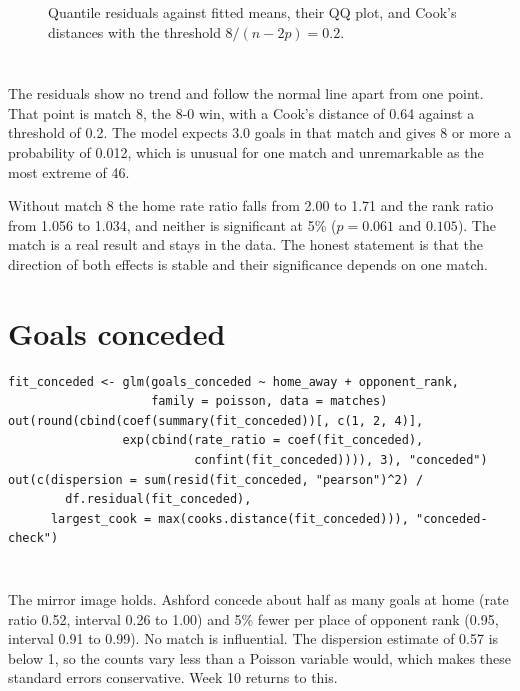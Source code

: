 \documentclass[12pt,notitlepage]{report}
\begin{document}
\begin{figure}[H]
  \centering
  \caption{Quantile residuals against fitted means, their QQ plot, and Cook's
    distances with the threshold $8/(n - 2p) = 0.2$.}
  \label{fig:checks}
\end{figure}

\inputminted{text}{output/match-8.txt}
\inputminted{text}{output/without-match-8.txt}

The residuals show no trend and follow the normal line apart from one point.
That point is match 8, the 8-0 win, with a Cook's distance of 0.64 against a
threshold of 0.2. The model expects 3.0 goals in that match and gives 8 or
more a probability of 0.012, which is unusual for one match and unremarkable
as the most extreme of 46.

Without match 8 the home rate ratio falls from 2.00 to 1.71 and the rank
ratio from 1.056 to 1.034, and neither is significant at 5\% ($p = 0.061$
and $0.105$). The match is a real result and stays in the data. The honest
statement is that the direction of both effects is stable and their
significance depends on one match.

\section{Goals conceded}

\begin{verbatim}
fit_conceded <- glm(goals_conceded ~ home_away + opponent_rank,
                    family = poisson, data = matches)
out(round(cbind(coef(summary(fit_conceded))[, c(1, 2, 4)],
                exp(cbind(rate_ratio = coef(fit_conceded),
                          confint(fit_conceded)))), 3), "conceded")
out(c(dispersion = sum(resid(fit_conceded, "pearson")^2) /
        df.residual(fit_conceded),
      largest_cook = max(cooks.distance(fit_conceded))), "conceded-check")
\end{verbatim}

\inputminted[fontsize=\footnotesize]{text}{output/conceded.txt}
\inputminted{text}{output/conceded-check.txt}

The mirror image holds. Ashford concede about half as many goals at home
(rate ratio 0.52, interval 0.26 to 1.00) and 5\% fewer per place of opponent
rank (0.95, interval 0.91 to 0.99). No match is influential. The dispersion
estimate of 0.57 is below 1, so the counts vary less than a Poisson variable
would, which makes these standard errors conservative. Week 10 returns to
this.
\end{document}
